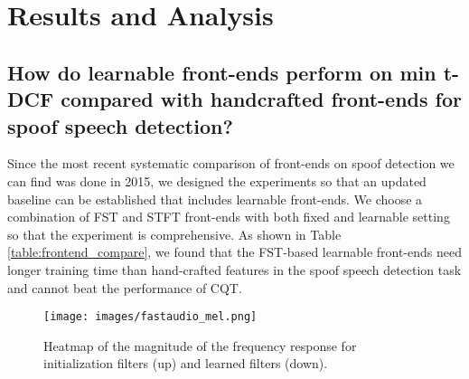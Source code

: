 \documentclass[conference]{IEEEtran}
\begin{document}
\section{Results and Analysis}
\label{results.section}

\subsection{\textbf{How do learnable front-ends perform on min t-DCF compared with handcrafted front-ends for spoof speech detection?}}

Since the most recent systematic comparison of front-ends on spoof detection we can find was done in 2015\cite{Xiao2015SpoofingSD}, we designed the experiments so that an updated baseline can be established that includes learnable front-ends. We choose a combination of FST and STFT front-ends with both fixed and learnable setting so that the experiment is comprehensive. As shown in Table \ref{table:frontend_compare}, we found that the FST-based learnable front-ends need longer training time than hand-crafted features in the spoof speech detection task and cannot beat the performance of CQT.

\begin{figure}[hbtp]
\centering
\texttt{[image: images/fastaudio\_mel.png]}
\caption{Heatmap of the magnitude of the frequency response for initialization filters (up) and learned filters (down).}
\label{fig:fastaudio-mel}
\end{figure}
\end{document}
